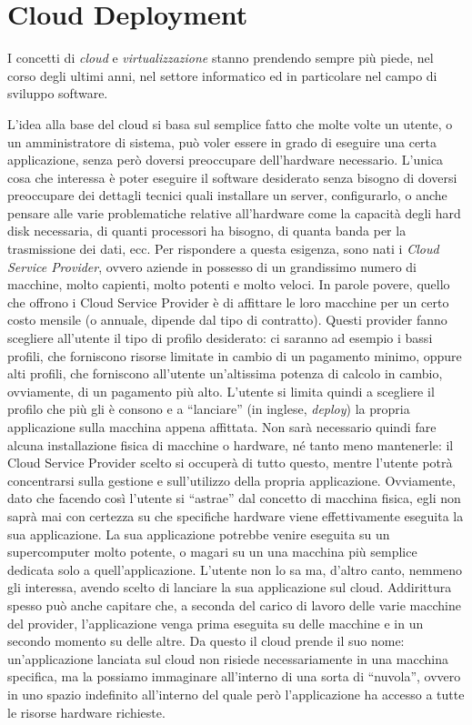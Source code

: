 \chapter{Cloud Deployment} \label{chap:cloud_deployment}

    I concetti di \textit{cloud} e \textit{virtualizzazione} stanno prendendo sempre più piede, nel corso degli ultimi anni, nel settore informatico ed in particolare nel campo di sviluppo software.
    
    L'idea alla base del cloud  si basa sul semplice fatto che molte volte un utente, o un amministratore di sistema, può voler essere in grado di eseguire una certa applicazione, senza però doversi preoccupare dell'hardware necessario. L'unica cosa che interessa è poter eseguire il software desiderato senza bisogno di doversi preoccupare dei dettagli tecnici quali installare un server, configurarlo, o anche pensare alle varie problematiche relative all'hardware come la capacità degli hard disk necessaria, di quanti processori ha bisogno, di quanta banda per la trasmissione dei dati, ecc. Per rispondere a questa esigenza, sono nati i \textit{Cloud Service Provider}, ovvero aziende in possesso di un grandissimo numero di macchine, molto capienti, molto potenti e molto veloci. In parole povere, quello che offrono i Cloud Service Provider è di affittare le loro macchine per un certo costo mensile (o annuale, dipende dal tipo di contratto). Questi provider fanno scegliere all'utente il tipo di profilo desiderato: ci saranno ad esempio i bassi profili, che forniscono risorse limitate in cambio di un pagamento minimo, oppure alti profili, che forniscono all'utente un'altissima potenza di calcolo in cambio, ovviamente, di un pagamento più alto. L'utente si limita quindi a scegliere il profilo che più gli è consono e a ``lanciare'' (in inglese, \textit{deploy}) la propria applicazione sulla macchina appena affittata. Non sarà necessario quindi fare alcuna installazione fisica di macchine o hardware, né tanto meno mantenerle: il Cloud Service Provider scelto si occuperà di tutto questo, mentre l'utente potrà concentrarsi sulla gestione e sull'utilizzo della propria applicazione. Ovviamente, dato che facendo così l'utente si ``astrae'' dal concetto di macchina fisica, egli non saprà mai con certezza su che specifiche hardware viene effettivamente eseguita la sua applicazione. La sua applicazione potrebbe venire eseguita su un supercomputer molto potente, o magari su un una macchina più semplice dedicata solo a quell'applicazione. L'utente non lo sa ma, d'altro canto, nemmeno gli interessa, avendo scelto di lanciare la sua applicazione sul cloud. Addirittura spesso può anche capitare che, a seconda del carico di lavoro delle varie macchine del provider, l'applicazione venga prima eseguita su delle macchine e in un secondo momento su delle altre. Da questo il cloud prende il suo nome: un'applicazione lanciata sul cloud non risiede necessariamente in una macchina specifica, ma la possiamo immaginare all'interno di una sorta di ``nuvola'', ovvero in uno spazio indefinito all'interno del quale però l'applicazione ha accesso a tutte le risorse hardware richieste.
    

